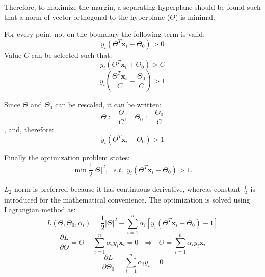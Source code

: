 \noindent Therefore, to maximize the margin, a separating hyperplane should be found such that a norm of vector orthogonal to the hyperplane ($\Theta$) is minimal. 

For every point not on the boundary the following term is valid:
\begin{equation} 
y_i \left(\Theta^T \mathbf{x}_i + \Theta_0\right) > 0 
\end{equation}
Value $C$ can be selected such that:
\begin{equation} 
y_i \left(\Theta^T \mathbf{x}_i + \Theta_0\right) > C
\end{equation}
\begin{equation} 
y_i \left(\frac{\Theta^T \mathbf{x}_i}{C} + \frac{\Theta_0}{C}\right) > 1
\end{equation}

Since $\Theta$ and $\Theta_0$ can be rescaled, it can be written:
\begin{equation} 
\Theta := \frac{\Theta}{C}, \,\,\,\,\,\, \Theta_0 := \frac{\Theta_0}{C}
\end{equation}
, and, therefore:
\begin{equation}  \label{eq:SVM-constraint}
 y_i \left(\Theta^T \mathbf{x}_i + \Theta_0\right) > 1
\end{equation}

Finally the optimization problem states:
\begin{equation} 
\min \frac{1}{2} \vert \Theta \vert ^2, \,\,\,\, s.t. \,\,\, y_i \left(\Theta^T \mathbf{x}_i + \Theta_0\right) > 1.
\end{equation}

\noindent $L_2$ norm is preferred because it has continuous derivative, whereas constant $\nicefrac{1}{2}$ is introduced for the mathematical convenience. The optimization is solved using Lagrangian method as:
\begin{equation} \label{eq:SVM-opt}
L(\Theta, \Theta_0, \alpha_i) = \frac{1}{2} \vert \Theta \vert ^2 - \sum_{i=1}^n \alpha_i \left[y_i \left(\Theta^T \mathbf{x}_i + \Theta_0\right) - 1\right]
\end{equation}
\begin{equation} \label{eq:SVM-primal}
\frac{\partial L}{\partial \Theta} = \Theta - \sum_{i=1}^n \alpha_i y_i \mathbf{x}_i = 0 \,\,\,\, \Rightarrow \,\,\,\, \Theta = \sum_{i=1}^n \alpha_i y_i \mathbf{x}_i
\end{equation}
\begin{equation} \label{eq:SVM-dual}
\frac{\partial L}{\partial \Theta_0} = \sum_{i=1}^n \alpha_i y_i = 0
\end{equation}

